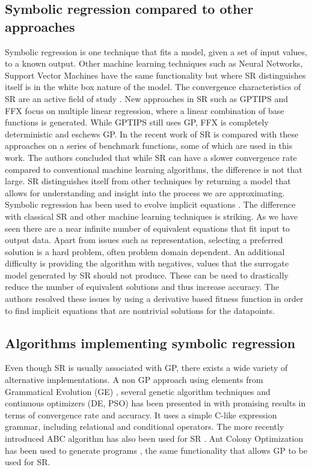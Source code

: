 \subsection{Symbolic regression compared to other approaches}
Symbolic regression is one technique that fits a model, given a set of input values, to a known output. Other machine learning techniques such as Neural Networks, Support Vector Machines have the same functionality but where SR distinguishes itself is in the white box nature of the model. The convergence characteristics of SR are an active field of study \citep{SRAccur}. New approaches in SR such as GPTIPS and FFX \citep{GPTIPS, FFX} focus on multiple linear regression, where a linear combination of base functions is generated. While GPTIPS still uses GP, FFX is completely deterministic and eschews GP.
In the recent work of \citep{SRlinear} SR is compared with these approaches on a series of benchmark functions, some of which are used in this work. The authors concluded that while SR can have a slower convergence rate compared to conventional machine learning algorithms, the difference is not that large. SR distinguishes itself from other techniques by returning a model that allows for understanding and insight into the process we are approximating.
Symbolic regression has been used to evolve implicit equations \citep{SRimplicit}. The difference with classical SR and other machine learning techniques is striking. As we have seen there are a near infinite number of equivalent equations that fit input to output data. Apart from issues such as representation, selecting a preferred solution is a hard problem, often problem domain dependent. An additional difficulty is providing the algorithm with negatives, values that the surrogate model generated by SR should not produce. These can be used to drastically reduce the number of equivalent solutions and thus increase accuracy. The authors resolved these issues by using a derivative based fitness function in order to find implicit equations that are nontrivial solutions for the datapoints.

\subsection{Algorithms implementing symbolic regression}
Even though SR is usually associated with GP, there exists a wide variety of alternative implementations.
A non GP approach using elements from Grammatical Evolution (GE) \cite{GE}, several genetic algorithm techniques and continuous optimizers (DE, PSO) has been presented in \citep{AEG} with promising results in terms of convergence rate and accuracy. 
It uses a simple C-like expression grammar, including relational and conditional operators. 
The more recently introduced ABC algorithm has also been used for SR \cite{ABCSR}. 
Ant Colony Optimization \citep{ACO} has been used to generate programs \citep{ACOSR}, the same functionality that allows GP to be used for SR.

